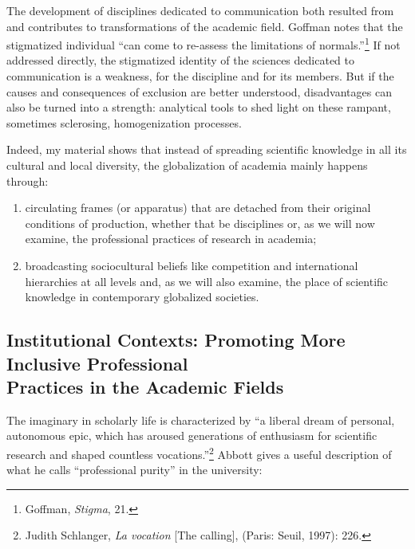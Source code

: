\documentclass{tufte-handout}
\begin{document}
The development of disciplines dedicated to communication both resulted
from and contributes to transformations of the academic field. Goffman
notes that the stigmatized individual ``can come to re-assess the
limitations of normals.''\footnote{Goffman, \emph{Stigma}, 21.} If not
addressed directly, the stigmatized identity of the sciences dedicated
to communication is a weakness, for the discipline and for its members.
But if the causes and consequences of exclusion are better understood,
disadvantages can also be turned into a strength: analytical tools to
shed light on these rampant, sometimes sclerosing, homogenization
processes.

Indeed, my material shows that instead of spreading scientific knowledge
in all its cultural and local diversity, the globalization of academia
mainly happens through:

\begin{enumerate}
\item
  circulating frames (or apparatus) that are detached from their
  original conditions of production, whether that be disciplines or, as
  we will now examine, the professional practices of research in
  academia;
\item
  broadcasting sociocultural beliefs like competition and international
  hierarchies at all levels and, as we will also examine, the place of
  scientific knowledge in contemporary globalized societies.
\end{enumerate}

\hypertarget{institutional-contexts-promoting-more-inclusive-professional-practices-in-the-academic-fields}{%
\subsection{Institutional Contexts: Promoting
More Inclusive Professional\\\noindent Practices in the Academic
Fields}\label{institutional-contexts-promoting-more-inclusive-professional-practices-in-the-academic-fields}}

The imaginary in scholarly life is characterized by ``a liberal dream of
personal, autonomous epic, which has aroused generations of enthusiasm
for scientific research and shaped countless vocations.''\footnote{Judith
  Schlanger, \emph{La vocation} {[}The calling{]}, (Paris: Seuil, 1997):
  226.} Abbott gives a useful description of what he calls
``professional purity'' in the university:
\end{document}
